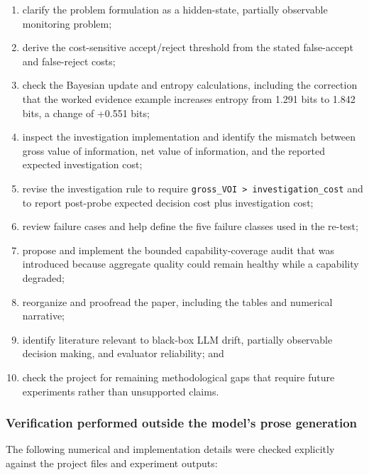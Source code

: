 \documentclass[
]{article}
\providecommand{\tightlist}{%
  \setlength{\itemsep}{0pt}\setlength{\parskip}{0pt}}
\begin{document}
\begin{enumerate}
\def\labelenumi{\arabic{enumi}.}
\tightlist
\item
  clarify the problem formulation as a hidden-state, partially
  observable monitoring problem;
\item
  derive the cost-sensitive accept/reject threshold from the stated
  false-accept and false-reject costs;
\item
  check the Bayesian update and entropy calculations, including the
  correction that the worked evidence example increases entropy from
  1.291 bits to 1.842 bits, a change of +0.551 bits;
\item
  inspect the investigation implementation and identify the mismatch
  between gross value of information, net value of information, and the
  reported expected investigation cost;
\item
  revise the investigation rule to require
  \texttt{gross\_VOI\ \textgreater{}\ investigation\_cost} and to report
  post-probe expected decision cost plus investigation cost;
\item
  review failure cases and help define the five failure classes used in
  the re-test;
\item
  propose and implement the bounded capability-coverage audit that was
  introduced because aggregate quality could remain healthy while a
  capability degraded;
\item
  reorganize and proofread the paper, including the tables and numerical
  narrative;
\item
  identify literature relevant to black-box LLM drift, partially
  observable decision making, and evaluator reliability; and
\item
  check the project for remaining methodological gaps that require
  future experiments rather than unsupported claims.
\end{enumerate}

\subsubsection{Verification performed outside the model's prose
generation}\label{verification-performed-outside-the-models-prose-generation}

The following numerical and implementation details were checked
explicitly against the project files and experiment outputs:
\end{document}
